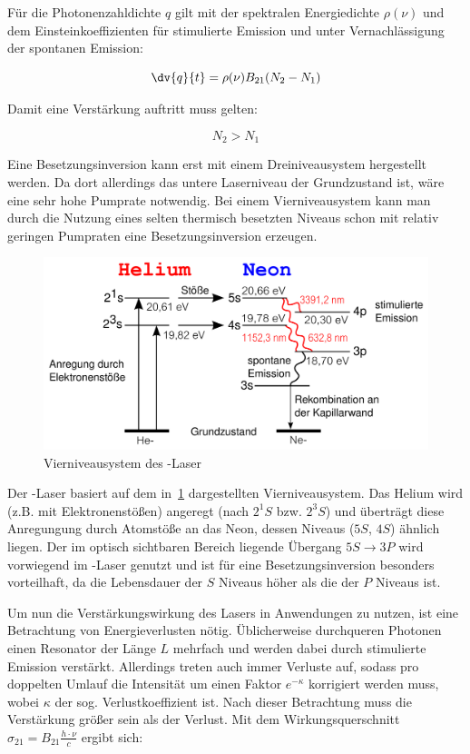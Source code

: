 \documentclass[slug=GL, room=HZDR\ Dresden/Rossendorf\,\ Geb.\ 620/123, supervisor=Tim\ Ziegler]{../../Lab_Report_LaTeX/lab_report}
\newcommand{\hne}{\ce{HeNe}-Laser}
\begin{document}
F\"ur die Photonenzahldichte \(q\) gilt mit der spektralen
Energiedichte \(\rho(\nu)\) und dem Einsteinkoeffizienten f\"ur
stimulierte Emission und unter Vernachl\"assigung der spontanen
Emission:

\begin{equation}
  \label{eq:qrate}
  \dv{q}{t}=\rho(\nu)B_{21}(N_2-N_1)
\end{equation}

Damit eine Verst\"arkung auftritt muss gelten:

\begin{equation}
  \label{eq:first}
  \tag{Erste Laserbedingung}
  N_2>N_1
\end{equation}

Eine Besetzungsinversion kann erst mit einem Dreiniveausystem
hergestellt werden. Da dort allerdings das untere Laserniveau der
Grundzustand ist, w\"are eine sehr hohe Pumprate notwendig. Bei einem
Vierniveausystem kann man durch die Nutzung eines selten thermisch
besetzten Niveaus schon mit relativ geringen Pumpraten eine
Besetzungsinversion erzeugen.

\begin{figure}[H]\centering
  \includegraphics[width=.8\columnwidth]{heneniv.png}
  \caption[Aufbau]{Vierniveausystem des \hne{}}
  \label{fig:niveaus}
\end{figure}

Der \hne{} basiert auf dem in~\ref{fig:niveaus} dargestellten
Vierniveausystem. Das Helium wird (z.B. mit Elektronenst\"o\ss{}en)
angeregt (nach \(2^1S\) bzw. \(2^3S\)) und \"ubertr\"agt diese
Anregungung durch Atomst\"o\ss{}e an das Neon, dessen Niveaus (\(5S\),
\(4S\)) \"ahnlich liegen. Der im optisch sichtbaren Bereich liegende
\"Ubergang \(5S\rightarrow 3P\) wird vorwiegend im \hne{} genutzt und
ist f\"ur eine Besetzungsinversion besonders vorteilhaft, da die
Lebensdauer der \(S\) Niveaus h\"oher als die der \(P\) Niveaus ist.


Um nun die Verst\"arkungswirkung des Lasers in Anwendungen zu nutzen,
ist eine Betrachtung von Energieverlusten n\"otig. \"Ublicherweise
durchqueren Photonen einen Resonator der L\"ange \(L\) mehrfach und
werden dabei durch stimulierte Emission verst\"arkt. Allerdings treten
auch immer Verluste auf, sodass pro doppelten Umlauf die
Intensit\"at um einen Faktor \(e^{-\kappa}\) korrigiert werden muss,
wobei \(\kappa\) der sog. Verlustkoeffizient ist. Nach dieser
Betrachtung muss die Verst\"arkung gr\"o\ss{}er sein als der Verlust.
Mit dem Wirkungsquerschnitt \(\sigma_{21}=B_{21}\frac{h\cdot\nu}{c}\)
ergibt sich:
\end{document}
